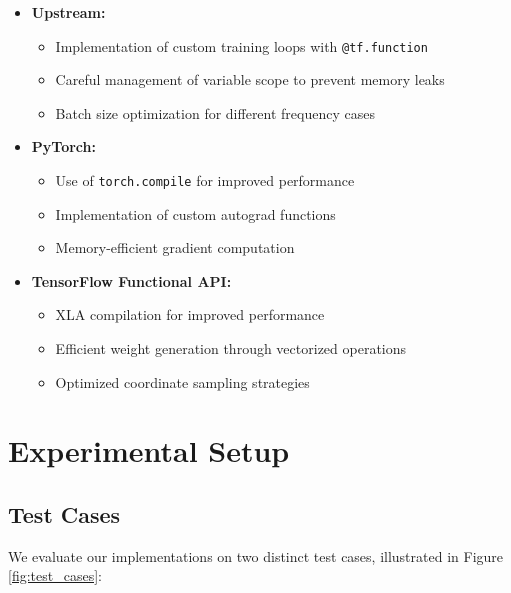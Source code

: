 \documentclass[10pt,journal,compsoc]{IEEEtran}
\begin{document}
\begin{itemize}
    \item \textbf{Upstream:}
    \begin{itemize}
        \item Implementation of custom training loops with \texttt{@tf.function}
        \item Careful management of variable scope to prevent memory leaks
        \item Batch size optimization for different frequency cases
    \end{itemize}
    \item \textbf{PyTorch:}
    \begin{itemize}
        \item Use of \texttt{torch.compile} for improved performance
        \item Implementation of custom autograd functions
        \item Memory-efficient gradient computation
    \end{itemize}
    \item \textbf{TensorFlow Functional API:}
    \begin{itemize}
        \item XLA compilation for improved performance
        \item Efficient weight generation through vectorized operations
        \item Optimized coordinate sampling strategies
    \end{itemize}
\end{itemize}

\section{Experimental Setup}
\subsection{Test Cases}
We evaluate our implementations on two distinct test cases, illustrated in Figure \ref{fig:test_cases}:
\end{document}
